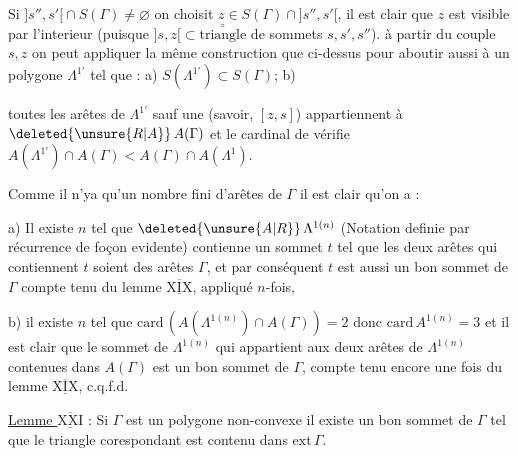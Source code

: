 Si $ {]s'',s'[}\cap S(\Gamma)\ne\varnothing$ on choisit $z\in S(\Gamma)\cap{]s'',s'[}$, il est clair que $z$ est visible  par l'interieur (puisque $ {]s,z[}\subset\overset{\circ}{\text{triangle}}$ de sommets $s,s',s''$). à partir du couple $s,z$ on peut appliquer la même construction que ci-dessus pour aboutir aussi à un polygone $\Lambda^{1'}$ tel que : a) $S(\Lambda^{1'})\subset S(\Gamma)$; b)

toutes les  arêtes de $\Lambda^{1'}$ sauf une (savoir, $[z,s]$) appartiennent à $\deleted{\unsure{R|A}}\,A(\Gamma)$ et le cardinal de vérifie $A(\Lambda^{1'})\cap A(\Gamma)<A(\Gamma)\cap A(\Lambda^1)$.

Comme il n'ya qu'un nombre fini d'arêtes de $\Gamma$ il est clair qu'on  a :

a) Il existe $n$ tel que $\deleted{\unsure{A|R}}\,\Lambda^{1(n)}$ (Notation definie par récurrence de foçon evidente) contienne un  sommet $t$ tel que les deux arêtes qui contiennent $t$ soient des arêtes $\Gamma$, et par conséquent $t$ est aussi un bon sommet de $\Gamma$ compte tenu du lemme $\overline{\underline{\mathrm{XIX}}}$, appliqué $n$-fois, 

b) il existe $n$ tel que $\mathrm{card}\,(A({\Lambda}^{1(n)})\cap A(\Gamma))=2$ donc $\mathrm{card}\,A^{1(n)}=3$ et il est clair que le  sommet de $\Lambda^{1(n)}$ qui appartient aux deux arêtes de $\Lambda^{1(n)}$ contenues dans $A(\Gamma)$ est un bon sommet de $\Gamma$, compte tenu encore une fois du lemme $\overline{\underline{\mathrm{XIX}}}$, c.q.f.d.

\uline{Lemme $\overline{\underline{\mathrm{XXI}}}$} : Si $\Gamma$ est un polygone non-convexe il existe un bon sommet de $\Gamma$ tel que le  triangle corespondant est contenu dans $\mathrm{ext}\,\Gamma$.

